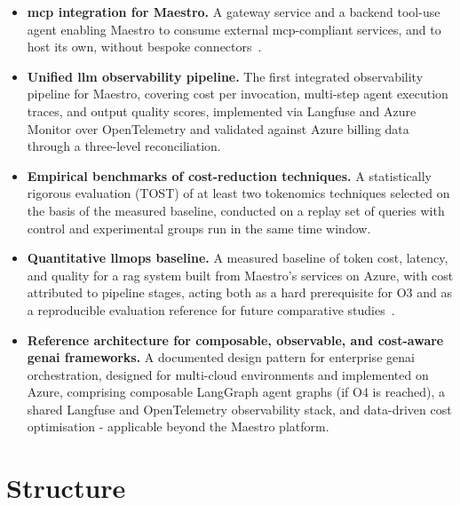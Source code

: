 \begin{itemize}

    \item \textbf{\gls{mcp} integration for Maestro.} A gateway service and a
    backend tool-use agent enabling Maestro to consume external
    \gls{mcp}-compliant services, and to host its own, without bespoke
    connectors~\cite{anthropic2024mcp, modelcontextprotocol2024}.

    \item \textbf{Unified \gls{llm} observability pipeline.} The first
    integrated observability pipeline for Maestro, covering cost per
    invocation, multi-step agent execution traces, and output quality scores,
    implemented via Langfuse and Azure Monitor over OpenTelemetry and
    validated against Azure billing data through a three-level reconciliation.

    \item \textbf{Empirical benchmarks of cost-reduction techniques.} A
    statistically rigorous evaluation (TOST) of at least two
    tokenomics techniques selected on the basis of the measured baseline,
    conducted on a replay set of queries with control and experimental groups
    run in the same time window.

    \item \textbf{Quantitative \acrfull{llmops} baseline.} A measured
    baseline of token cost, latency, and quality for a \gls{rag} system built
    from Maestro's services on Azure, with cost attributed to pipeline stages,
    acting both as a hard prerequisite for O3 and as a reproducible evaluation
    reference for future comparative studies~\cite{es2023ragas}.

    \item \textbf{Reference architecture for composable, observable, and
    cost-aware \gls{genai} frameworks.} A documented design pattern for enterprise
    \gls{genai} orchestration, designed for multi-cloud environments and
    implemented on Azure, comprising
    composable LangGraph agent graphs (if O4 is reached), a shared Langfuse and OpenTelemetry
    observability stack, and data-driven cost optimisation - applicable
    beyond the Maestro platform.

\end{itemize}


\section{Structure}
\label{sec:structure}

